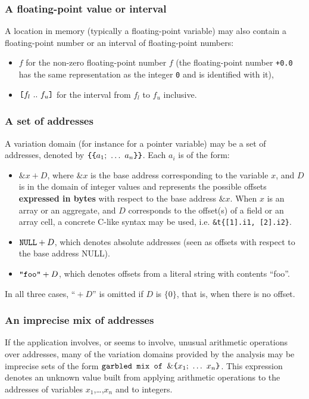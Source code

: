 \documentclass[web]{frama-c-book}
\newcommand{\bropen}{\mbox{\tt [}}
\newcommand{\brclose}{\mbox{\tt ]}}
\newcommand{\cbopen}{\mbox{\tt \{}}
\newcommand{\cbclose}{\mbox{\tt \}}}
\begin{document}
\subsubsection{A floating-point value or interval} 
A location in memory (typically a floating-point variable) 
may also contain a floating-point number
or an interval of floating-point numbers:
  \begin{itemize}
  \item $f$ for the non-zero floating-point number $f$ (the floating-point number \lstinline|+0.0| has the same representation as the integer \lstinline|0| and is identified with it),
  \item $\bropen f_l\ ..\ f_u\brclose$ for the interval from $f_l$ to
$f_u$ inclusive.
  \end{itemize}
\subsubsection{A set of addresses}
A variation domain (for instance for a pointer variable)
may be a set of addresses, denoted by
       $\cbopen\cbopen a_1;\ \ldots\ a_n \cbclose\cbclose$.
Each $a_i$ is of the form:
  \begin{itemize}
  \item $\&x + D$, where $\&x$ is the base address corresponding to the
    variable $x$, and $D$ is in the domain of integer values and represents
    the possible offsets {\bf expressed in bytes} with respect to the base
    address $\&x$. When $x$ is an array or an aggregate, and $D$ corresponds
    to the offset(s) of a field or an array cell, a concrete C-like syntax
    may be used, i.e. \verb+&t{[1].i1, [2].i2}+.
  \item $\mbox{\tt NULL} + D$, which denotes absolute addresses (seen
as offsets with respect to the base address NULL).
  \item $\mbox{\tt "foo"} + D$, which denotes offsets from a literal
string with contents ``foo''.
  \end{itemize}
In all three cases, ``${}+D$'' is omitted if $D$ is $\{0\}$, that is,
when there is no offset.

\subsubsection{An imprecise mix of addresses}
If the application involves, or seems to involve, unusual arithmetic
operations over addresses, many of the variation domains provided by
the analysis may be imprecise sets of the form
 $\mbox{\tt garbled mix of }\&\cbopen x_1;\ \ldots\ x_n \cbclose$.
This expression
 denotes an unknown value built from applying arithmetic operations 
to the addresses of variables $x_1$,\ldots,$x_n$ and to integers. 
\end{document}
